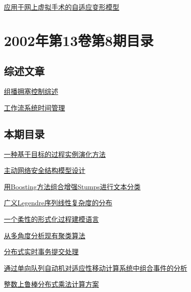 \documentclass[a4paper]{article}
\begin{document}
\href{http://www.jos.org.cn/ch/reader/download_pdf.aspx?file_no=20020920&year_id=2002&quarter_id=9&falg=1}{应用于网上虚拟手术的自适应变形模型}


\section{\textbf{2002年第13卷第8期目录}}
\subsection{综述文章}
\href{http://www.jos.org.cn/ch/reader/download_pdf.aspx?file_no=20020814&year_id=2002&quarter_id=8&falg=1}{组播拥塞控制综述}

\href{http://www.jos.org.cn/ch/reader/download_pdf.aspx?file_no=20020830&year_id=2002&quarter_id=8&falg=1}{工作流系统时间管理}

\subsection{本期目录}
\href{http://www.jos.org.cn/ch/reader/download_pdf.aspx?file_no=20020801&year_id=2002&quarter_id=8&falg=1}{一种基于目标的过程实例演化方法}

\href{http://www.jos.org.cn/ch/reader/download_pdf.aspx?file_no=20020802&year_id=2002&quarter_id=8&falg=1}{主动网络安全结构模型设计}

\href{http://www.jos.org.cn/ch/reader/download_pdf.aspx?file_no=20020803&year_id=2002&quarter_id=8&falg=1}{用Boosting方法组合增强Stumps进行文本分类}

\href{http://www.jos.org.cn/ch/reader/download_pdf.aspx?file_no=20020804&year_id=2002&quarter_id=8&falg=1}{广义Legendre序列线性复杂度的分布}

\href{http://www.jos.org.cn/ch/reader/download_pdf.aspx?file_no=20020805&year_id=2002&quarter_id=8&falg=1}{一个柔性的形式化过程建模语言}

\href{http://www.jos.org.cn/ch/reader/download_pdf.aspx?file_no=20020806&year_id=2002&quarter_id=8&falg=1}{从多角度分析现有聚类算法}

\href{http://www.jos.org.cn/ch/reader/download_pdf.aspx?file_no=20020807&year_id=2002&quarter_id=8&falg=1}{分布式实时事务提交处理}

\href{http://www.jos.org.cn/ch/reader/download_pdf.aspx?file_no=20020808&year_id=2002&quarter_id=8&falg=1}{通过单向队列自动机对适应性移动计算系统中组合事件的分析}

\href{http://www.jos.org.cn/ch/reader/download_pdf.aspx?file_no=20020809&year_id=2002&quarter_id=8&falg=1}{整数上鲁棒分布式乘法计算方案}
\end{document}
